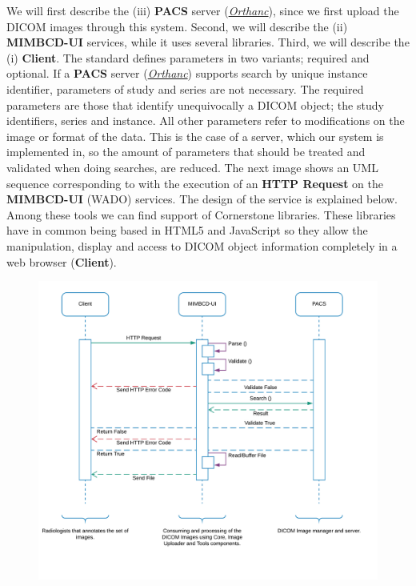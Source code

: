 \documentclass{tufte-book} %
\begin{document}
We will first describe the (iii) \textbf{PACS} server (\href{https://www.orthanc-server.com/}{\textit{Orthanc}}), since we first upload the DICOM images through this system. Second, we will describe the (ii) \textbf{MIMBCD-UI} services, while it uses several libraries. Third, we will describe the (i) \textbf{Client}. The standard defines parameters in two variants; required and optional. If a \textbf{PACS} server (\href{https://www.orthanc-server.com/}{\textit{Orthanc}}) supports search by unique instance identifier, parameters of study and series are not necessary. The required parameters are those that identify unequivocally a DICOM object; the study identifiers, series and instance. All other parameters refer to modifications on the image or format of the data. This is the case of a server, which our system is implemented in, so the amount of parameters that should be treated and validated when doing searches, are reduced. The next image shows an UML sequence corresponding to with the execution of an \textbf{HTTP Request} on the \textbf{MIMBCD-UI} (WADO) services. The design of the service is explained below. Among these tools we can find support of Cornerstone \cite{arbelaiz2017volume} libraries. These libraries have in common being based in HTML5 and JavaScript so they allow the manipulation, display and access to DICOM object information completely in a web browser (\textbf{Client}).

\clearpage


\begin{figure}[!hbt]
\begin{center}
\includegraphics[width=\textwidth]{graphics/core_uml.png}
\end{center}
\end{figure}
\end{document}
